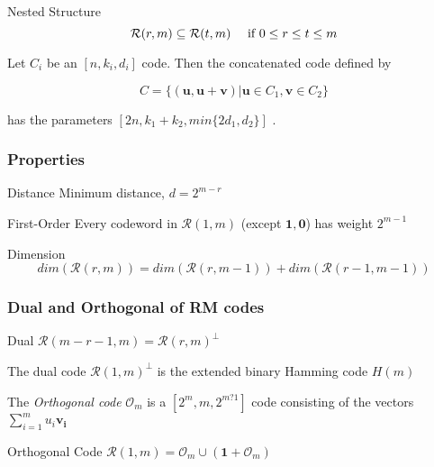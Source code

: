 \message{ !name(1.tex)}\documentclass[xcolor=xvgnames]{beamer}
\newcommand{\RM}[2]{\ensuremath{\mathcal{R}(#1,#2)}}
\newcommand{\V}[1]{\ensuremath{\mathbf{#1}}}
\begin{document}

\begin{frame}
 \begin{block}{Nested Structure}
\begin{equation*}
\RM{r}{m} \subseteq \RM{t}{m} \quad
\text{ if } 0 \leq r \leq t \leq m \\
\end{equation*}
\end{block}

\begin{theorem}
\label{general}
Let $C_i$ be an $[n,k_i,d_i]$ code. Then the concatenated code defined by

  \begin{equation*}
    C = \{(\V{u},\V{u}+\V{v}) | \V{u} \in C_1 , \V{v} \in C_2 \}
  \end{equation*}

has the parameters $[2n,k_1+k_2, min\{2d_1,d_2\}]$ .
\end{theorem}

\end{frame}


\begin{frame}
 \frametitle{Properties}
\begin{block}{Distance}
Minimum distance, $d=2^{m-r}$
\end{block}

\begin{block}{First-Order}
\label{equidistant}
Every codeword in $\RM{1}{m}$ (except $\V{1}, \V{0}$) has weight $2^{m-1}$
\end{block}

\begin{block}{Dimension}
  \label{eq:1}
  \begin{equation*}
      dim(\RM{r}{m}) = dim(\RM{r}{m-1}) + dim(\RM{r-1}{m-1})
  \end{equation*}
\end{block}

\end{frame}


\begin{frame}
\frametitle{Dual and Orthogonal of RM codes}
\begin{block}{Dual}
  $ \RM{m-r-1}{m} = \RM{r}{m}^{\bot} $
\end{block}

The dual code $\RM{1}{m}^{\bot}$ is the extended binary Hamming code $H(m)$ 

The \emph{Orthogonal code} $\mathcal{O}_m$ is a $[2^m, m, 2^{m?1}]$ code consisting of the vectors $ \sum_{i=1}^m{u_i\V{v_i}} $

\begin{block}{Orthogonal Code}
  $\RM{1}{m} = \mathcal{O}_m \cup (\V{1} + \mathcal{O}_m)$
\end{block}

\end{frame}
\end{document}
